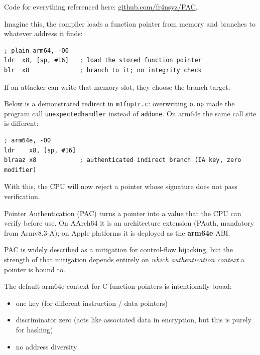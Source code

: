 

\newcommand{\DocTitle}{Pointer Authentication on arm64e: tightening function pointers}
\newcommand{\DocDescription}{one valid pointer in the wrong slot}
\newcommand{\DocTags}{writeup, cybersecurity, low-level, arm64e}



Code for everything referenced here: \href{https://github.com/fr4nsyz/PAC}{github.com/fr4nsyz/PAC}.


Imagine this, the compiler loads a function pointer from memory and branches to whatever address it finds:

\begin{verbatim}
; plain arm64, -O0
ldr  x8, [sp, #16]   ; load the stored function pointer
blr  x8              ; branch to it; no integrity check
\end{verbatim}

If an attacker can write that memory slot, they choose the branch target.

Below is a demonstrated redirect in \texttt{m1\uscore{}fnptr.c}: overwriting \texttt{o.op} made the program call \texttt{unexpected\uscore{}handler} instead of \texttt{add\uscore{}one}. On arm64e the same call site is different:

\begin{verbatim}
; arm64e, -O0
ldr    x8, [sp, #16]
blraaz x8            ; authenticated indirect branch (IA key, zero modifier)
\end{verbatim}

With this, the CPU will now reject a pointer whose signature does not pass verification.

Pointer Authentication (PAC) turns a pointer into a value that the CPU can verify before use. On AArch64 it is an architecture extension (PAuth, mandatory from Armv8.3-A); on Apple platforms it is deployed as the \textbf{arm64e} ABI.

PAC is widely described as a mitigation for control-flow hijacking, but the strength of that mitigation depends entirely on \textit{which authentication context} a pointer is bound to.

The default arm64e context for C function pointers is intentionally broad:

\begin{itemize}
\item one key (for different instruction / data pointers)
\item discriminator zero (acts like associated data in encryption, but this is purely for hashing)
\item no address diversity
\end{itemize}

